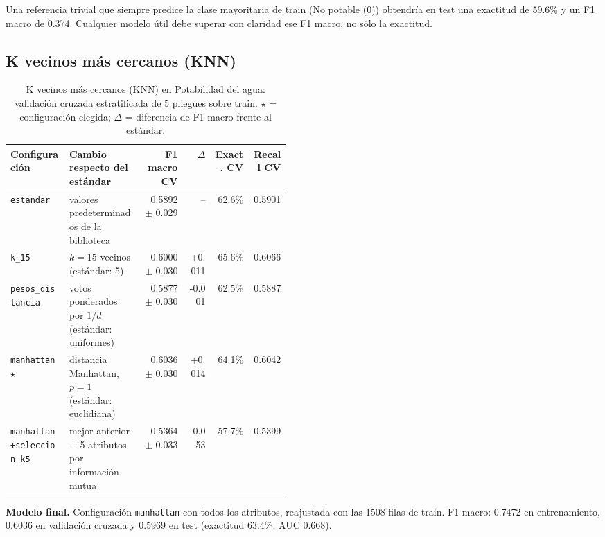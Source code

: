 \documentclass[11pt]{article}
\begin{document}
Una referencia trivial que siempre predice la clase mayoritaria de train (No potable (0)) obtendría en test una exactitud de 59.6\% y un F1 macro de 0.374. Cualquier modelo útil debe superar con claridad ese F1 macro, no sólo la exactitud.

\subsection{K vecinos más cercanos (KNN)}

\begin{table}[H]\centering\footnotesize
\caption{K vecinos más cercanos (KNN) en Potabilidad del agua: validación cruzada estratificada de 5 pliegues sobre train. $\star$ = configuración elegida; $\Delta$ = diferencia de F1 macro frente al estándar.}
\begin{tabular}{>{\raggedright\arraybackslash}p{0.21\linewidth}>{\raggedright\arraybackslash}p{0.26\linewidth}rrrr}\toprule
Configuración & Cambio respecto del estándar & F1 macro CV & $\Delta$ & Exact. CV & Recall CV \\ \midrule
\texttt{estandar} & valores predeterminados de la biblioteca & 0.5892 $\pm$ 0.029 & -- & 62.6\% & 0.5901 \\
\texttt{k\_\allowbreak{}15} & $k=15$ vecinos (estándar: 5) & 0.6000 $\pm$ 0.030 & +0.011 & 65.6\% & 0.6066 \\
\texttt{pesos\_\allowbreak{}distancia} & votos ponderados por $1/d$ (estándar: uniformes) & 0.5877 $\pm$ 0.030 & -0.001 & 62.5\% & 0.5887 \\
\texttt{manhattan} $\star$ & distancia Manhattan, $p=1$ (estándar: euclidiana) & 0.6036 $\pm$ 0.030 & +0.014 & 64.1\% & 0.6042 \\
\texttt{manhattan+\allowbreak{}seleccion\_\allowbreak{}k5} & mejor anterior + 5 atributos por información mutua & 0.5364 $\pm$ 0.033 & -0.053 & 57.7\% & 0.5399 \\
\bottomrule\end{tabular}
\end{table}

\textbf{Modelo final.} Configuración \texttt{manhattan} con todos los atributos, reajustada con las 1508 filas de train. F1 macro: 0.7472 en entrenamiento, 0.6036 en validación cruzada y 0.5969 en test (exactitud 63.4\%, AUC 0.668).
\end{document}
